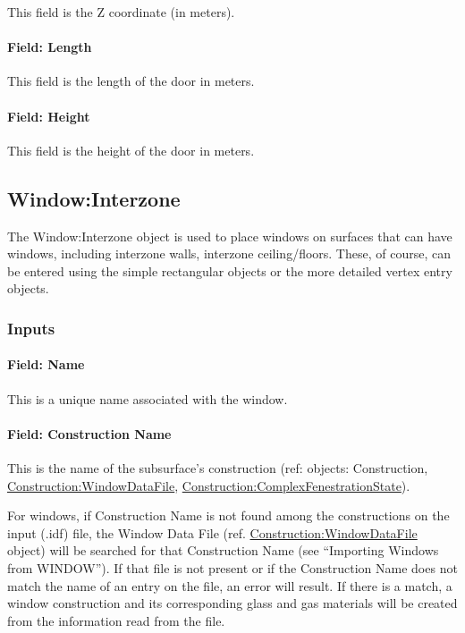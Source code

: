 This field is the Z coordinate (in meters).

\paragraph{Field: Length}\label{field-length-12}

This field is the length of the door in meters.

\paragraph{Field: Height}\label{field-height-6}

This field is the height of the door in meters.

\subsection{Window:Interzone}\label{windowinterzone}

The Window:Interzone object is used to place windows on surfaces that can have windows, including interzone walls, interzone ceiling/floors. These, of course, can be entered using the simple rectangular objects or the more detailed vertex entry objects.

\subsubsection{Inputs}\label{inputs-17-010}

\paragraph{Field: Name}\label{field-name-13-011}

This is a unique name associated with the window.

\paragraph{Field: Construction Name}\label{field-construction-name-13}

This is the name of the subsurface's construction (ref: objects: Construction, \hyperref[constructionwindowdatafile]{Construction:WindowDataFile}, \hyperref[constructioncomplexfenestrationstate]{Construction:ComplexFenestrationState}).

For windows, if Construction Name is not found among the constructions on the input (.idf) file, the Window Data File (ref. \hyperref[constructionwindowdatafile]{Construction:WindowDataFile} object) will be searched for that Construction Name (see ``Importing Windows from WINDOW''). If that file is not present or if the Construction Name does not match the name of an entry on the file, an error will result. If there is a match, a window construction and its corresponding glass and gas materials will be created from the information read from the file.

